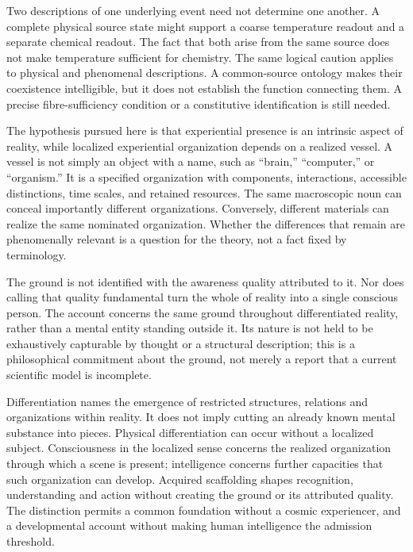 Two descriptions of one underlying event need not determine one another. A complete physical source state might support a coarse temperature readout and a separate chemical readout. The fact that both arise from the same source does not make temperature sufficient for chemistry. The same logical caution applies to physical and phenomenal descriptions. A common-source ontology makes their coexistence intelligible, but it does not establish the function connecting them. A precise fibre-sufficiency condition or a constitutive identification is still needed.

The hypothesis pursued here is that experiential presence is an intrinsic aspect of reality, while localized experiential organization depends on a realized vessel. A vessel is not simply an object with a name, such as ``brain,'' ``computer,'' or ``organism.'' It is a specified organization with components, interactions, accessible distinctions, time scales, and retained resources. The same macroscopic noun can conceal importantly different organizations. Conversely, different materials can realize the same nominated organization. Whether the differences that remain are phenomenally relevant is a question for the theory, not a fact fixed by terminology.

The ground is not identified with the awareness quality attributed to it. Nor does calling that quality fundamental turn the whole of reality into a single conscious person. The account concerns the same ground throughout differentiated reality, rather than a mental entity standing outside it. Its nature is not held to be exhaustively capturable by thought or a structural description; this is a philosophical commitment about the ground, not merely a report that a current scientific model is incomplete.

Differentiation names the emergence of restricted structures, relations and organizations within reality. It does not imply cutting an already known mental substance into pieces. Physical differentiation can occur without a localized subject. Consciousness in the localized sense concerns the realized organization through which a scene is present; intelligence concerns further capacities that such organization can develop. Acquired scaffolding shapes recognition, understanding and action without creating the ground or its attributed quality. The distinction permits a common foundation without a cosmic experiencer, and a developmental account without making human intelligence the admission threshold.

